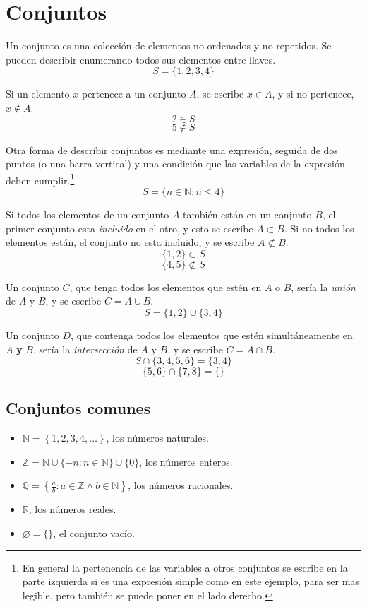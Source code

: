 \documentclass[../teoria.root.tex]{subfiles}
\begin{document}
\section{Conjuntos}

Un conjunto es una colección de elementos no ordenados y no repetidos. Se
pueden describir enumerando todos sus elementos entre llaves.
\[S=\{1,2,3,4\}\]

Si un elemento $x$ pertenece a un conjunto $A$, se escribe $x\in A$, y si no
pertenece, $x\notin A$.
\[2\in S\]
\[5\notin S\]

Otra forma de describir conjuntos es mediante una expresión, seguida de dos
puntos (o una barra vertical) y una condición que las variables de la expresión
deben cumplir.\footnote{En general la pertenencia de las variables a otros
conjuntos se escribe en la parte izquierda si es una expresión simple como en
este ejemplo, para ser mas legible, pero también se puede poner en el lado
derecho.}
\[S=\{n\in\mathbb{N}:n\leq4\}\]

Si todos los elementos de un conjunto $A$ también están en un conjunto $B$, el
primer conjunto esta \textit{incluido} en el otro, y esto se escribe $A\subset
B$. Si no todos los elementos están, el conjunto no esta incluido, y se escribe
$A\not\subset B$.
\[\{1,2\}\subset S\]
\[\{4,5\}\not\subset S\]

Un conjunto $C$, que tenga todos los elementos que estén en $A$ o $B$, sería la
\textit{unión} de $A$ y $B$, y se escribe $C=A\cup B$.
\[S=\{1,2\}\cup\{3,4\}\]

Un conjunto $D$, que contenga todos los elementos que estén simultáneamente en
$A$ \textbf{y} $B$, sería la \textit{intersección} de $A$ y $B$, y se escribe
$C=A\cap B$.
\[S\cap\{3,4,5,6\}=\{3,4\}\]
\[\{5,6\}\cap\{7,8\}=\{\}\]

\subsection{Conjuntos comunes}

\begin{itemize}
	\item $\mathbb{N}=\left\{1,2,3,4,\ldots\right\}$, los números naturales.
	\item $\mathbb{Z}=\mathbb{N}\cup\{-n:n\in\mathbb{N}\}\cup\{0\}$, los números enteros.
	\item $\mathbb{Q}=\left\{\frac{a}{b}:a\in\mathbb{Z}\land b\in\mathbb{N}\right\}$, los números racionales.
	\item $\mathbb{R}$, los números reales.
	\item $\varnothing=\{\}$, el conjunto vacío.
\end{itemize}
\end{document}
